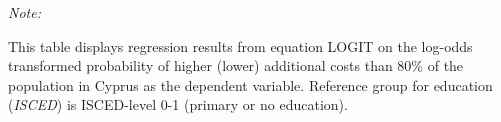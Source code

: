 \begin{table}[htbp!]
\begin{adjustbox}{width = 1\textwidth, max height = 0.95\textheight, center}
\begin{threeparttable}[b]
         \begin{tablenotes}\item \medskip \textit{Note:}
            \item This table displays regression results from equation LOGIT on the log-odds transformed probability of higher (lower) additional costs than 80\% of the population in Cyprus as the dependent variable. Reference group for education (\textit{ISCED}) is ISCED-level 0-1 (primary or no education).
         \end{tablenotes}
      \end{threeparttable}
   \end{adjustbox}
\end{table}


